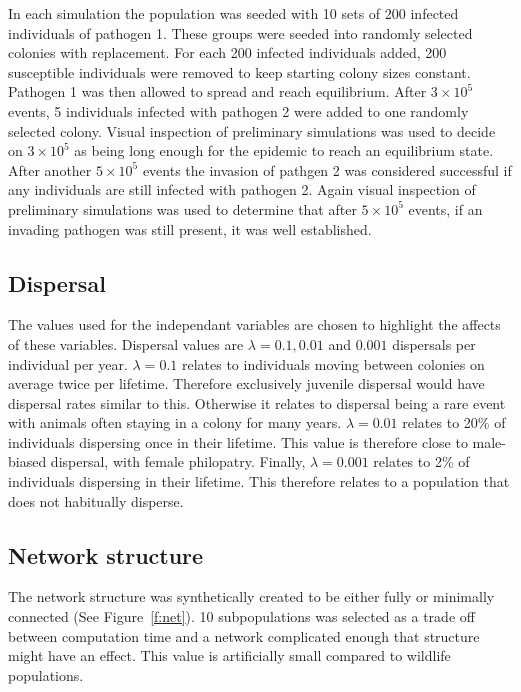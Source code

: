 In each simulation the population was seeded with 10 sets of 200 infected individuals of pathogen 1.
These groups were seeded into randomly selected colonies with replacement.
For each 200 infected individuals added, 200 susceptible individuals were removed to keep starting colony sizes constant. 
Pathogen 1 was then allowed to spread and reach equilibrium. 
After \ensuremath{3\times 10^{5}} events, 5 individuals infected with pathogen 2 were added to one randomly selected colony. 
Visual inspection of preliminary simulations was used to decide on \ensuremath{3\times 10^{5}} as being long enough for the epidemic to reach an equilibrium state.
After another \ensuremath{5\times 10^{5}} events the invasion of pathgen 2 was considered successful if any individuals are still infected with pathogen 2.
Again visual inspection of preliminary simulations was used to determine that after \ensuremath{5\times 10^{5}} events, if an invading pathogen was still present, it was well established. 


\subsection{Dispersal}

The values used for the independant variables are chosen to highlight the affects of these variables. 
Dispersal values are $\lambda = 0.1, 0.01$ and $ 0.001$ dispersals per individual per year. 
$\lambda = 0.1$ relates to individuals moving between colonies on average twice per lifetime. 
Therefore exclusively juvenile dispersal would have dispersal rates similar to this. 
Otherwise it relates to dispersal being a rare event with animals often staying in a colony for many years.
$\lambda = 0.01$ relates to 20\% of individuals dispersing once in their lifetime.
This value is therefore close to male-biased dispersal, with female philopatry. 
Finally, $\lambda = 0.001$ relates to 2\% of individuals dispersing in their lifetime.
This therefore relates to a population that does not habitually disperse.




\subsection{Network structure}
The network structure was synthetically created to be either fully or minimally connected (See Figure~\ref{f:net}). 
10 subpopulations was selected as a trade off between computation time and a network complicated enough that structure might have an effect. 
This value is artificially small compared to wildlife populations. 



